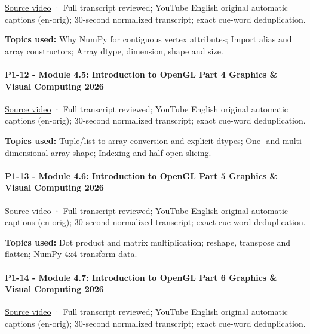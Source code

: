 \href{https://www.youtube.com/watch?v=sr-4ZAnBXIM}{Source video} · Full transcript reviewed; YouTube English original automatic captions (en-orig); 30-second normalized transcript; exact cue-word deduplication.

\textbf{Topics used:} Why NumPy for contiguous vertex attributes; Import alias and array constructors; Array dtype, dimension, shape and size.

\paragraph{P1-12 - Module 4.5: Introduction to OpenGL Part 4 Graphics \& Visual Computing 2026}\label{p1-12---module-4.5-introduction-to-opengl-part-4-graphics-visual-computing-2026}

\href{https://www.youtube.com/watch?v=Eu4pGvCAOhI}{Source video} · Full transcript reviewed; YouTube English original automatic captions (en-orig); 30-second normalized transcript; exact cue-word deduplication.

\textbf{Topics used:} Tuple/list-to-array conversion and explicit dtypes; One- and multi-dimensional array shape; Indexing and half-open slicing.

\paragraph{P1-13 - Module 4.6: Introduction to OpenGL Part 5 Graphics \& Visual Computing 2026}\label{p1-13---module-4.6-introduction-to-opengl-part-5-graphics-visual-computing-2026}

\href{https://www.youtube.com/watch?v=e2GQBMBWyh0}{Source video} · Full transcript reviewed; YouTube English original automatic captions (en-orig); 30-second normalized transcript; exact cue-word deduplication.

\textbf{Topics used:} Dot product and matrix multiplication; reshape, transpose and flatten; NumPy 4x4 transform data.

\paragraph{P1-14 - Module 4.7: Introduction to OpenGL Part 6 Graphics \& Visual Computing 2026}\label{p1-14---module-4.7-introduction-to-opengl-part-6-graphics-visual-computing-2026}

\href{https://www.youtube.com/watch?v=EtgZoNuFZiw}{Source video} · Full transcript reviewed; YouTube English original automatic captions (en-orig); 30-second normalized transcript; exact cue-word deduplication.

